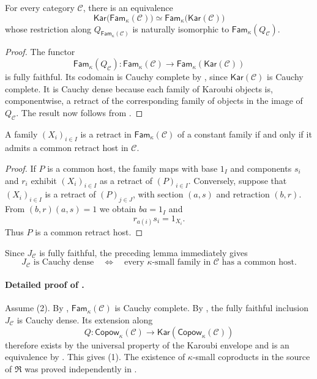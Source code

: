 \documentclass[runningheads,envcountsame]{llncs}
\newcommand{\Copow}{\mathsf{Copow}}
\newcommand{\Fam}{\mathsf{Fam}}
\newcommand{\Kar}{\mathsf{Kar}}
\newcommand{\Rlz}{\mathfrak R}
\begin{document}
\begin{proposition}
\label{prop:kar-fam-app}
For every category $\mathcal C$, there is an equivalence
$$
\Kar\bigl(\Fam_\kappa(\mathcal C)\bigr)
\simeq
\Fam_\kappa\bigl(\Kar(\mathcal C)\bigr)
$$
whose restriction along $Q_{\Fam_\kappa(\mathcal C)}$ is naturally
isomorphic to $\Fam_\kappa(Q_{\mathcal C})$.
\end{proposition}

\begin{proof}
The functor
$$
\Fam_\kappa(Q_{\mathcal C}):
\Fam_\kappa(\mathcal C)
\longrightarrow
\Fam_\kappa(\Kar(\mathcal C))
$$
is fully faithful.  Its codomain is Cauchy complete by
, since $\Kar(\mathcal C)$ is Cauchy complete.
It is Cauchy dense because each family of Karoubi objects is, componentwise,
a retract of the corresponding family of objects in the image of
$Q_{\mathcal C}$.  The result now follows from
.
\end{proof}

\begin{lemma}
\label{lem:retract-constant-app}
A family $(X_i)_{i\in I}$ is a retract in $\Fam_\kappa(\mathcal C)$ of a
constant family if and only if it admits a common retract host in
$\mathcal C$.
\end{lemma}

\begin{proof}
If $P$ is a common host, the family maps with base $1_I$ and components
$s_i$ and $r_i$ exhibit $(X_i)_{i\in I}$ as a retract of $(P)_{i\in I}$.
Conversely, suppose that $(X_i)_{i\in I}$ is a retract of $(P)_{j\in J}$,
with section $(a,s)$ and retraction $(b,r)$.  From
$(b,r)(a,s)=1$ we obtain $ba=1_I$ and
$$
r_{a(i)}s_i=1_{X_i}.
$$
Thus $P$ is a common retract host.
\end{proof}

Since $J_{\mathcal C}$ is fully faithful, the preceding lemma immediately
gives
$$
J_{\mathcal C}\text{ is Cauchy dense}
\quad\Longleftrightarrow\quad
\text{every $\kappa$-small family in $\mathcal C$ has a common host}.
$$

\paragraph{Detailed proof of .}
Assume (2).  By ,
$\Fam_\kappa(\mathcal C)$ is Cauchy complete.  By
, the fully faithful inclusion
$J_{\mathcal C}$ is Cauchy dense.  Its extension along
$$
Q:\Copow_\kappa(\mathcal C)
\longrightarrow
\Kar(\Copow_\kappa(\mathcal C))
$$
therefore exists by the universal property of the Karoubi envelope and is an
equivalence by .  This gives (1).
The existence of $\kappa$-small coproducts in the source of $\Rlz$ was proved
independently in .
\end{document}
